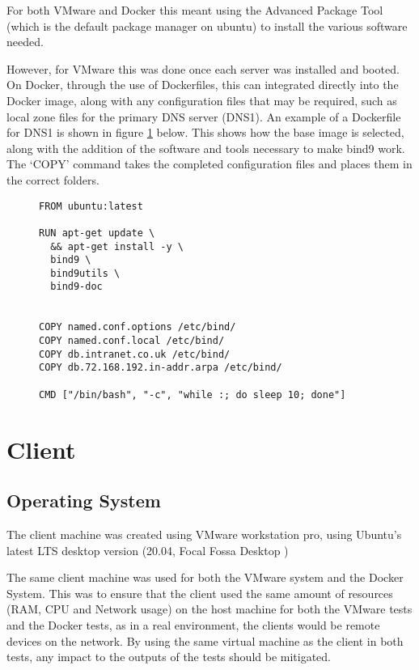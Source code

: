 For both VMware and Docker this meant using the Advanced Package Tool (which is the default package manager on ubuntu) to install the various software needed.

However, for VMware this was done once each server was installed and booted. On Docker, through the use of Dockerfiles, this can integrated directly into the Docker image, along with any configuration files that may be required, such as local zone files for the primary DNS server (DNS1). An example of a Dockerfile for DNS1 is shown in figure \ref{fig:dockerfileexample} below. This shows how the base image is selected, along with the addition of the software and tools necessary to make bind9 work. The `COPY' command takes the completed configuration files and places them in the correct folders.
\begin{figure}[h]
\caption{}
\label{fig:dockerfileexample}
\begin{verbatim}
FROM ubuntu:latest

RUN apt-get update \
  && apt-get install -y \
  bind9 \
  bind9utils \
  bind9-doc


COPY named.conf.options /etc/bind/
COPY named.conf.local /etc/bind/
COPY db.intranet.co.uk /etc/bind/
COPY db.72.168.192.in-addr.arpa /etc/bind/

CMD ["/bin/bash", "-c", "while :; do sleep 10; done"]

\end{verbatim}

\end{figure}

\section{Client}
\subsection{Operating System}
\label{ClientOS}
The client machine was created using VMware workstation pro, using Ubuntu's latest LTS desktop version (20.04, Focal Fossa Desktop \citep{UbuntuDesktopDocumentation})

The same client machine was used for both the VMware system and the Docker System. This was to ensure that the client used the same amount of resources (RAM, CPU and Network usage) on the host machine for both the VMware tests and the Docker tests, as in a real environment, the clients would be remote devices on the network. By using the same virtual machine as the client in both tests, any impact to the outputs of the tests should be mitigated.

